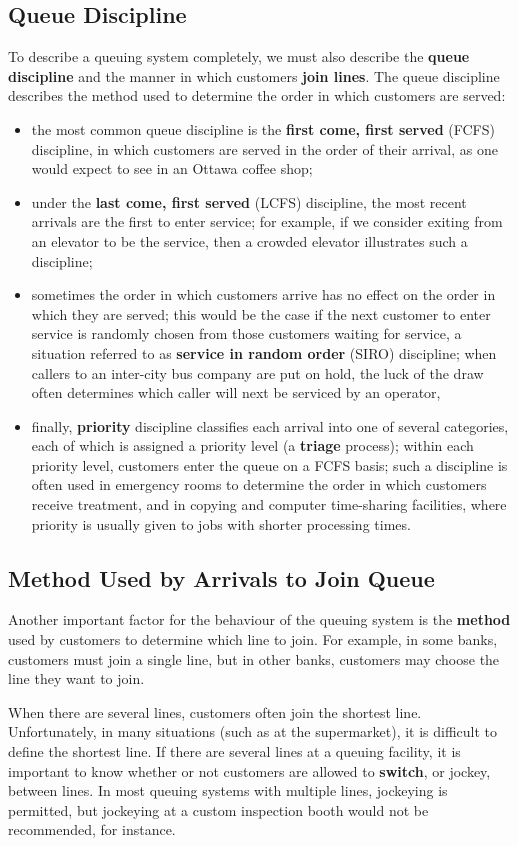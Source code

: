 \subsection{Queue Discipline}
To describe a queuing system completely, we must also describe the \textbf{queue discipline} and the manner in which customers \textbf{join lines}. The queue discipline describes the method used to determine the order in which customers are served: 
\begin{itemize}
\item the most common queue discipline is the \textbf{first come, first served} (FCFS) discipline, in which customers are served in the order of their arrival, as one would expect to see in an Ottawa coffee shop;
\item under the \textbf{last come, first served} (LCFS) discipline, the most recent arrivals are the first to enter service; for example, if we consider exiting from an elevator to be the service, then a crowded elevator illustrates such a discipline;
\item sometimes the order in which customers arrive has no effect on the order in which they are served; this would be the case if the next customer to enter service is randomly chosen from those customers waiting for service, a situation referred to as \textbf{service in random order} (SIRO) discipline; when callers to an inter-city bus company are put on hold, the luck of the draw often determines which caller will next be serviced by an operator, 
\item finally, \textbf{priority} discipline classifies each arrival into one of several categories, each of which is assigned a priority level (a \textbf{triage} process); within each priority level, customers enter the queue on a FCFS basis; such a discipline is often used in emergency rooms to determine the order in which customers receive treatment, and in copying and computer time-sharing facilities, where priority is usually given to jobs with shorter processing times.
\end{itemize}

\subsection{Method Used by Arrivals to Join Queue}
Another important factor for the behaviour of the queuing system is the \textbf{method} used by customers to determine which line to join. For example, in some banks, customers must join a single line, but in other banks, customers may choose the line they want to join. \par  When there are several lines, customers often join the shortest line. Unfortunately, in many situations (such as at the supermarket), it is difficult to define the shortest line. If there are several lines at a queuing facility, it is important to know whether or not customers are allowed to \textbf{switch}, or jockey, between lines. In most queuing systems with multiple lines, jockeying is permitted, but jockeying at a custom inspection booth would not be recommended, for instance. 

